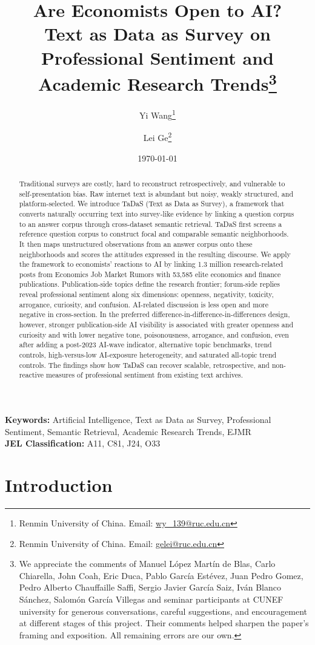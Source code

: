 \documentclass[11pt]{article}
\title{\textbf{Are Economists Open to AI? \\ Text as Data as Survey on Professional Sentiment and Academic Research Trends}\thanks{{\footnotesize We appreciate the comments of Manuel L\'{o}pez Mart\'{i}n de Blas, Carlo Chiarella, John Coah, Eric Duca, Pablo Garc\'{i}a Est\'{e}vez, Juan Pedro Gomez, Pedro Alberto Chauffaille Saffi, Sergio Javier Garc\'{i}a Saiz, Iv\'{a}n Blanco S\'{a}nchez, Salom\'{o}n Garc\'{i}a Villegas and seminar participants at CUNEF university for generous conversations, careful suggestions, and encouragement at different stages of this project. Their comments helped sharpen the paper's framing and exposition. All remaining errors are our own.}}}
\author{
    Yi Wang\thanks{Renmin University of China. Email: \href{mailto:wy\_139@ruc.edu.cn}{wy\_139@ruc.edu.cn}}
    \and
    Lei Ge\thanks{Renmin University of China. Email: \href{mailto:gelei@ruc.edu.cn}{gelei@ruc.edu.cn}}
}
\date{\today}
\begin{document}
\maketitle

\begin{abstract}
\noindent Traditional surveys are costly, hard to reconstruct retrospectively, and vulnerable to self-presentation bias. Raw internet text is abundant but noisy, weakly structured, and platform-selected. We introduce TaDaS (Text as Data as Survey), a framework that converts naturally occurring text into survey-like evidence by linking a question corpus to an answer corpus through cross-dataset semantic retrieval. TaDaS first screens a reference question corpus to construct focal and comparable semantic neighborhoods. It then maps unstructured observations from an answer corpus onto these neighborhoods and scores the attitudes expressed in the resulting discourse. We apply the framework to economists' reactions to AI by linking 1.3 million research-related posts from Economics Job Market Rumors with 53,585 elite economics and finance publications. Publication-side topics define the research frontier; forum-side replies reveal professional sentiment along six dimensions: openness, negativity, toxicity, arrogance, curiosity, and confusion. AI-related discussion is less open and more negative in cross-section. In the preferred difference-in-difference-in-differences design, however, stronger publication-side AI visibility is associated with greater openness and curiosity and with lower negative tone, poisonousness, arrogance, and confusion, even after adding a post-2023 AI-wave indicator, alternative topic benchmarks, trend controls, high-versus-low AI-exposure heterogeneity, and saturated all-topic trend controls. The findings show how TaDaS can recover scalable, retrospective, and non-reactive measures of professional sentiment from existing text archives.
\end{abstract}

\vspace{1em}
\noindent \textbf{Keywords:} Artificial Intelligence, Text as Data as Survey, Professional Sentiment, Semantic Retrieval, Academic Research Trends, EJMR \\
\noindent \textbf{JEL Classification:} A11, C81, J24, O33

\clearpage

\section{Introduction}
\end{document}
